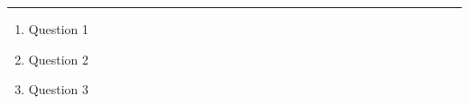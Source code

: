 \documentclass[11pt]{article}
\begin{document}
\Large

\medskip\hrule\bigskip\bigskip
{}
\begin{enumerate}

\item Question 1
  \vspace*{0.27\textheight}
\item Question 2
  \vspace*{0.27\textheight}
\item Question 3
  
\end{enumerate}
\end{document}
